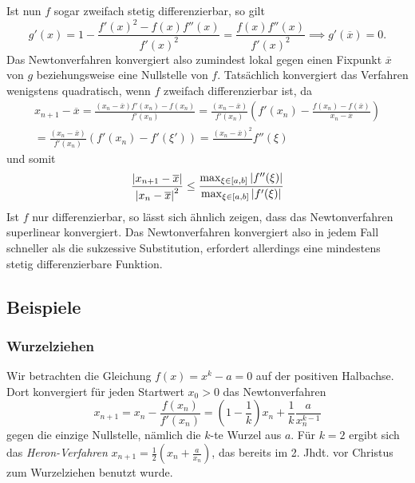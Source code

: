 Ist nun $f$ sogar zweifach stetig differenzierbar, so gilt
\begin{equation}
  g'(x) = 1 - \frac{f'(x)^2 - f(x)f''(x)}{f'(x)^2} =
  \frac{f(x)f''(x)}{f'(x)^2} \implies g'(\overline{x}) = 0.
\end{equation}
Das Newtonverfahren konvergiert also zumindest lokal gegen einen
Fixpunkt $\overline{x}$ von $g$ beziehungsweise eine Nullstelle von
$f$. Tatsächlich konvergiert das Verfahren wenigstens quadratisch,
wenn $f$ zweifach differenzierbar ist, da
\begin{align}
  x_{n+1} - \overline{x} = \frac{(x_n - \overline{x})f'(x_n) -
    f(x_n)}{f'(x_n)}
  = \frac{(x_n - \overline{x})}{f'(x_n)}\left( f'(x_n) -
    \frac{f(x_n) - f(\overline{x})}{x_n - \overline{x}}\right)\nonumber\\
  = \frac{(x_n - \overline{x})}{f'(x_n)}\left( f'(x_n) -
    f'(\xi')\right)
  = \frac{(x_n - \overline{x})^2}{}f''(\xi)
\end{align}
und somit
\begin{equation}
  \frac{\left\lvert{x_{n+1} - \overline{x}}\right\rvert}{\left\lvert{x_n - \overline{x}}\right\rvert^2}
  \le \frac{\max_{\xi\in [a,b]} \left\lvert{f''(\xi)}\right\rvert}{\max_{\xi\in [a,b]} \left\lvert{f'(\xi)}\right\rvert}
\end{equation}
Ist $f$ nur differenzierbar, so lässt sich ähnlich zeigen, dass das
Newtonverfahren superlinear konvergiert. Das Newtonverfahren
konvergiert also in jedem Fall schneller als die sukzessive
Substitution, erfordert allerdings eine mindestens stetig
differenzierbare Funktion.

\subsection{Beispiele}

\subsubsection{Wurzelziehen}

Wir betrachten die Gleichung $f(x) = x^k - a = 0$ auf der positiven
Halbachse. Dort konvergiert für jeden Startwert $x_0>0$ das
Newtonverfahren
\begin{equation}
  x_{n+1} = x_n - \frac{f(x_n)}{f'(x_n)} = \left(1 -
    \frac{1}{k}\right) x_n + \frac{1}{k} \frac{a}{x_n^{k-1}}
\end{equation}
gegen die einzige Nullstelle, nämlich die $k$-te Wurzel aus $a$. Für
$k=2$ ergibt sich das \emph{Heron-Verfahren} $x_{n+1} =
\frac{1}{2}\left(x_n + \frac{a}{x_n}\right)$, das bereits im 2. Jhdt. vor
Christus zum Wurzelziehen benutzt wurde.

